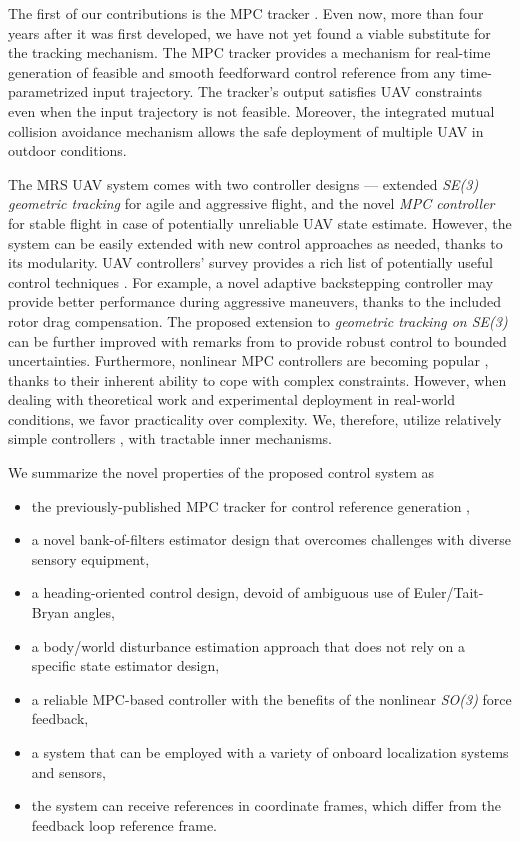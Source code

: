 \documentclass[a4paper,11pt,twoside,openright]{book}
\begin{document}
The first of our contributions is the \acl{MPC} tracker \cite{baca2018model}.
Even now, more than four years after it was first developed, we have not yet found a viable substitute for the tracking mechanism.
The \ac{MPC} tracker provides a mechanism for real-time generation of feasible and smooth feedforward control reference from any time-parametrized input trajectory.
The tracker's output satisfies \ac{UAV} constraints even when the input trajectory is not feasible.
Moreover, the integrated mutual collision avoidance mechanism allows the safe deployment of multiple \acl{UAV} in outdoor conditions.

The MRS \ac{UAV} system \cite{baca2020mrs} comes with two controller designs --- extended \emph{SE(3) geometric tracking} \cite{lee2010geometric} for agile and aggressive flight, and the novel \emph{MPC controller} for stable flight in case of potentially unreliable \ac{UAV} state estimate.
However, the system can be easily extended with new control approaches as needed, thanks to its modularity.
UAV controllers' survey provides a rich list of potentially useful control techniques \cite{nascimento2019position}.
For example, a novel adaptive backstepping controller \cite{zhang2019robust, labbadi2019robust} may provide better performance during aggressive maneuvers, thanks to the included rotor drag compensation.
The proposed extension to \emph{geometric tracking on SE(3)} \cite{lee2010geometric} can be further improved with remarks from \cite{lee2013nonlinear} to provide robust control to bounded uncertainties.
Furthermore, nonlinear \ac{MPC} controllers are becoming popular \cite{nascimento2019nmpc, pereira2019nonlinear, kamel2017robust}, thanks to their inherent ability to cope with complex constraints.
However, when dealing with theoretical work and experimental deployment in real-world conditions, we favor practicality over complexity.
We, therefore, utilize relatively simple controllers \cite{baca2020mrs}, with tractable inner mechanisms.

We summarize the novel properties of the proposed control system as
\begin{itemize}
  \item the previously-published \ac{MPC} tracker for control reference generation \cite{baca2018model},
  \item a novel bank-of-filters estimator design that overcomes challenges with diverse sensory equipment,
  \item a heading-oriented control design, devoid of ambiguous use of Euler/Tait-Bryan angles,
  \item a body/world disturbance estimation approach that does not rely on a specific state estimator design,
  \item a reliable MPC-based controller with the benefits of the nonlinear \emph{SO(3)} force feedback,
  \item a system that can be employed with a variety of onboard localization systems and sensors,
  \item the system can receive references in coordinate frames, which differ from the feedback loop reference frame.
\end{itemize}
\end{document}
